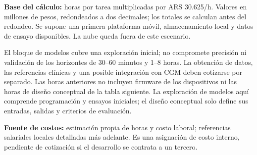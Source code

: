 \documentclass[11pt,a4paper]{article}
\begin{document}
\textbf{Base del cálculo:} horas por tarea multiplicadas por ARS 30.625/h. Valores en millones de pesos, redondeados a dos decimales; los totales se calculan antes del redondeo. Se supone una primera plataforma móvil, almacenamiento local y datos de ensayo disponibles. La nube queda fuera de este escenario.

El bloque de modelos cubre una exploración inicial; no compromete precisión ni validación de los horizontes de 30--60 minutos y 1--8 horas. La obtención de datos, las referencias clínicas y una posible integración con CGM deben cotizarse por separado. Las horas anteriores no incluyen firmware de los dispositivos ni las horas de diseño conceptual de la tabla siguiente. La exploración de modelos aquí comprende programación y ensayos iniciales; el diseño conceptual solo define sus entradas, salidas y criterios de evaluación.

\textbf{Fuente de costos:} estimación propia de horas y costo laboral; referencias salariales locales detalladas más adelante. Es una asignación de costo interno, pendiente de cotización si el desarrollo se contrata a un tercero.
\end{document}
